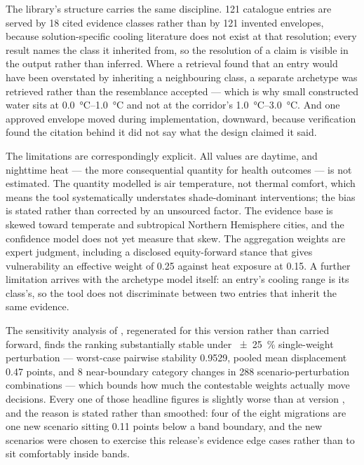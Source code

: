 The library's structure carries the same discipline. \num{121} catalogue
entries are served by \num{18} cited evidence classes rather than by \num{121}
invented envelopes, because solution-specific cooling literature does not exist
at that resolution; every result names the class it inherited from, so the
resolution of a claim is visible in the output rather than inferred. Where a
retrieval found that an entry would have been overstated by inheriting a
neighbouring class, a separate archetype was retrieved rather than the
resemblance accepted --- which is why small constructed water sits at
\SIrange{0.0}{1.0}{\degreeCelsius} and not at the corridor's
\SIrange{1.0}{3.0}{\degreeCelsius}. And one approved envelope moved during
implementation, downward, because verification found the citation behind it did
not say what the design claimed it said.

The limitations are correspondingly explicit. All values are daytime, and
nighttime heat --- the more consequential quantity for health outcomes --- is
not estimated. The quantity modelled is air temperature, not thermal comfort,
which means the tool systematically understates shade-dominant interventions;
the bias is stated rather than corrected by an unsourced factor. The evidence
base is skewed toward temperate and subtropical Northern Hemisphere cities, and
the confidence model does not yet measure that skew. The aggregation weights are
expert judgment, including a disclosed equity-forward stance that gives
vulnerability an effective weight of \num{0.25} against heat exposure at
\num{0.15}. A further limitation arrives with the archetype model itself: an
entry's cooling range is its class's, so the tool does not discriminate between
two entries that inherit the same evidence.

The sensitivity analysis of , regenerated for
this version rather than carried forward, finds the ranking substantially
stable under \SI{\pm 25}{\percent} single-weight perturbation --- worst-case
pairwise stability \num[group-digits=none]{0.9529}, pooled mean displacement \num{0.47} points,
and \num{8} near-boundary category changes in \num{288}
scenario-perturbation combinations --- which bounds how much the contestable
weights actually move decisions. Every one of those headline figures is
slightly worse than at version \prevver{}, and the reason is stated rather than
smoothed: four of the eight migrations are one new scenario sitting
\num{0.11} points below a band boundary, and the new scenarios were chosen to
exercise this release's evidence edge cases rather than to sit comfortably
inside bands.

